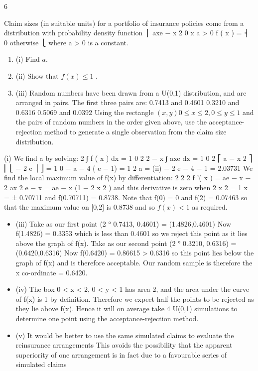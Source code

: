 6\documentclass[a4paper,12pt]{article}
\begin{document}
Claim sizes (in suitable units) for a portfolio of insurance policies come from a distribution with probability density function
⎪ axe − x 2 0 \leq x  a > 0
f ( x ) = ⎨
0 otherwise
⎩
where a > 0 is a constant.
\begin{enumerate}
\item (i) Find $a$. 
\item (ii) Show that $f ( x ) \leq 1$ . 
\item (iii) Random numbers have been drawn from a U(0,1) distribution, and are arranged in pairs. The first three pairs are:
0.7413 and 0.4601
0.3210 and 0.6316
0.5069 and 0.0392
Using the rectangle ${ ( x , y ) 0 \leq x \leq 2, 0 \leq y \leq 1 }$ and the pairs of random
numbers in the order given above, use the acceptance-rejection method to generate a single observation from the claim size distribution.
\end{enumerate}

(i)
We find a by solving:
2
∫ f ( x ) dx = 1
0
2
2
− x
∫ axe dx = 1
0
2
⎡ a − x 2 ⎤
⎢ ⎣ − 2 e ⎥ ⎦ = 1
0
− a − 4
( e − 1) = 1
2
a =
(ii)
− 2
e
− 4
− 1
= 2.03731
We find the local maximum value of f(x) by differentiation:
2
2
2
f '( x ) = ae − x − 2 ax 2 e − x = ae − x (1 − 2 x 2 )
and this derivative is zero when
2 x 2 = 1
x = ± 0.70711
and f(0.70711) = 0.8738.
Note that f(0) = 0 and f(2) = 0.07463 so that the maximum value on [0,2] is
0.8738 and so $f ( x ) < 1$ as required.


\begin{itemize}
\item (iii)
Take as our first point (2 ° 0.7413, 0.4601) = (1.4826,0.4601)
Now f(1.4826) = 0.3353 which is less than 0.4601 so we reject this point as it lies above the graph of f(x).
Take as our second point (2 ° 0.3210, 0.6316) = (0.6420,0.6316)
Now f(0.6420) = 0.86615 > 0.6316 so this point lies below the graph of f(x) and is therefore acceptable. Our random sample is therefore the x co-ordinate = 0.6420.
\item (iv) The box 0 < x < 2, 0 < y < 1 has area 2, and the area under the curve of f(x) is 1 by definition. Therefore we expect half the points to be rejected as they lie above f(x). Hence it will on average take 4 U(0,1) simulations to determine
one point using the acceptance-rejection method.
\item (v) It would be better to use the same simulated claims to evaluate the reinsurance arrangements This avoids the possibility that the apparent superiority of one arrangement is in fact due to a favourable series of simulated claims
\end{itemize}

\end{document}
